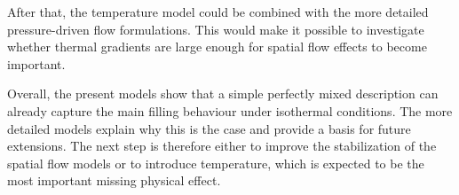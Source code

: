 After that, the temperature model could be combined with the more detailed pressure-driven flow formulations. This would make it possible to investigate whether thermal gradients are large enough for spatial flow effects to become important.

Overall, the present models show that a simple perfectly mixed description can already capture the main filling behaviour under isothermal conditions. The more detailed models explain why this is the case and provide a basis for future extensions. The next step is therefore either to improve the stabilization of the spatial flow models or to introduce temperature, which is expected to be the most important missing physical effect.
